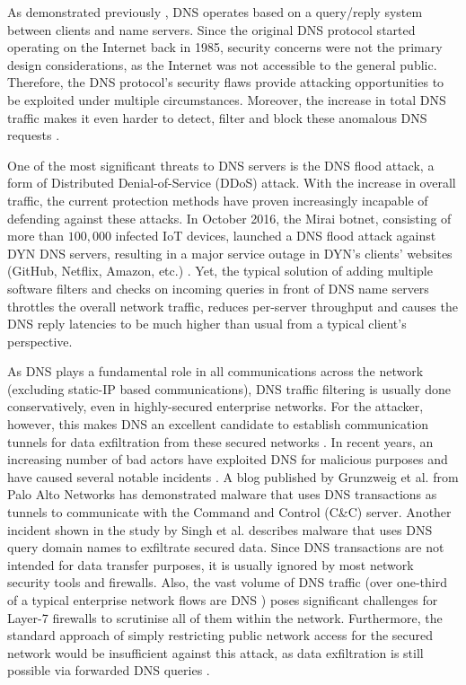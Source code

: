 \documentclass[a4paper]{report}
\begin{document}
As demonstrated previously \cite{RFC-1034, RFC-1035}, DNS operates based on a query/reply system between clients and name servers. Since the original DNS protocol started operating on the Internet back in 1985, security concerns were not the primary design considerations, as the Internet was not accessible to the general public. Therefore, the DNS protocol's security flaws provide attacking opportunities to be exploited under multiple circumstances\cite{antonakakis2010centralized}. Moreover, the increase in total DNS traffic makes it even harder to detect, filter and block these anomalous DNS requests \cite{kambourakis2007detecting}. 

One of the most significant threats to DNS servers is the DNS flood attack, a form of Distributed Denial-of-Service (DDoS) attack. With the increase in overall traffic, the current protection methods have proven increasingly incapable of defending against these attacks. In October 2016, the Mirai botnet, consisting of more than $100,000$ infected IoT devices, launched a DNS flood attack against DYN DNS servers, resulting in a major service outage in DYN's clients' websites (GitHub, Netflix, Amazon, etc.) \cite{bisson-2016}. Yet, the typical solution of adding multiple software filters and checks on incoming queries in front of DNS name servers throttles the overall network traffic, reduces per-server throughput and causes the DNS reply latencies to be much higher than usual from a typical client's perspective\cite{Mahjabin-2020}.
 
As DNS plays a fundamental role in all communications across the network (excluding static-IP based communications), DNS traffic filtering is usually done conservatively, even in highly-secured enterprise networks. For the attacker, however, this makes DNS an excellent candidate to establish communication tunnels for data exfiltration from these secured networks \cite{nadler-201936}. In recent years, an increasing number of bad actors have exploited DNS for malicious purposes and have caused several notable incidents \cite{das-8260721}. A blog published by Grunzweig et al.\cite{grunzweig_scott_lee_2018} from Palo Alto Networks has demonstrated malware that uses DNS transactions as tunnels to communicate with the Command and Control (C\&C) server. Another incident shown in the study by Singh et al.\cite{singh-2016} describes malware that uses DNS query domain names to exfiltrate secured data. Since DNS transactions are not intended for data transfer purposes, it is usually ignored by most network security tools and firewalls. Also, the vast volume of DNS traffic (over one-third of a typical enterprise network flows are DNS \cite{das-8260721}) poses significant challenges for Layer-7 firewalls to scrutinise all of them within the network. Furthermore, the standard approach of simply restricting public network access for the secured network would be insufficient against this attack, as data exfiltration is still possible via forwarded DNS queries \cite{bromberger2011dns}.
\end{document}
